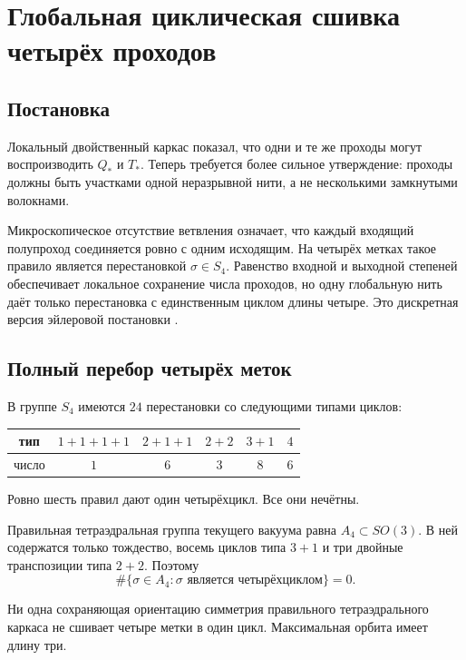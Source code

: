 \chapter{Глобальная циклическая сшивка четырёх проходов}
\label{ch:v6-single-thread-global-cycle-sewing-gate}

\section{Постановка}

Локальный двойственный каркас показал, что одни и те же проходы могут
воспроизводить $Q_*$ и $T_*$. Теперь требуется более сильное утверждение:
проходы должны быть участками одной неразрывной нити, а не несколькими
замкнутыми волокнами.

Микроскопическое отсутствие ветвления означает, что каждый входящий
полупроход соединяется ровно с одним исходящим. На четырёх метках такое
правило является перестановкой $\sigma\in S_4$. Равенство входной и
выходной степеней обеспечивает локальное сохранение числа проходов, но
одну глобальную нить даёт только перестановка с единственным циклом длины
четыре. Это дискретная версия эйлеровой постановки
\cite{single-thread-euler1741}.

\section{Полный перебор четырёх меток}

В группе $S_4$ имеются $24$ перестановки со следующими типами циклов:
\begin{center}
\begin{tabular}{c|ccccc}
тип & $1+1+1+1$ & $2+1+1$ & $2+2$ & $3+1$ & $4$\\
\hline
число & $1$ & $6$ & $3$ & $8$ & $6$
\end{tabular}
\end{center}
Ровно шесть правил дают один четырёхцикл. Все они нечётны.

Правильная тетраэдральная группа текущего вакуума равна $A_4\subset
SO(3)$. В ней содержатся только тождество, восемь циклов типа $3+1$ и три
двойные транспозиции типа $2+2$. Поэтому
\begin{equation}
 \#\{\sigma\in A_4:\sigma\text{ является четырёхциклом}\}=0.
\end{equation}

\begin{theorem}
Ни одна сохраняющая ориентацию симметрия правильного тетраэдрального
каркаса не сшивает четыре метки в один цикл. Максимальная орбита имеет
длину три.
\end{theorem}

